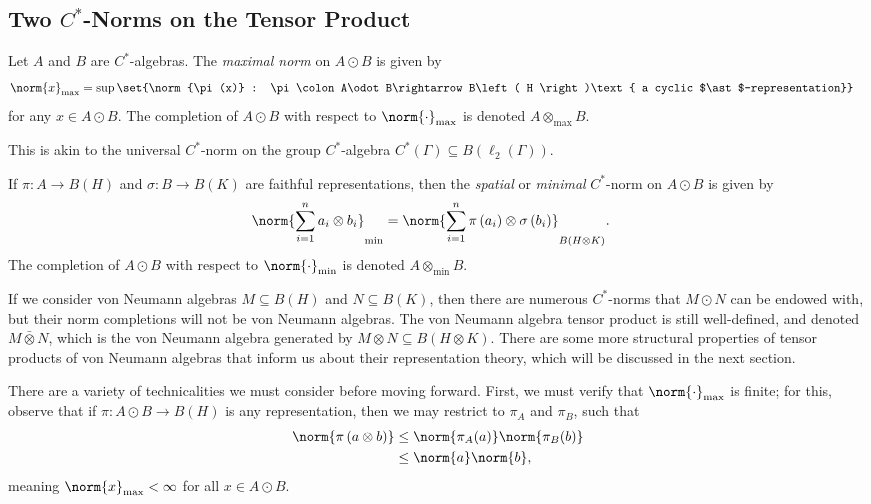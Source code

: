 \documentclass[10pt]{mypackage}
\begin{document}
\subsection{Two $C^{\ast}$-Norms on the Tensor Product}%
\begin{definition}
  Let $A$ and $B$ are $C^{\ast}$-algebras. The \textit{maximal norm} on $A\odot B$ is given by
  \begin{align*}
    \norm{x}_{\max} &= \sup\set{\norm{\pi(x)} : \pi\colon A\odot B\rightarrow B\left( H \right)\text{ a cyclic $\ast$-representation}}
  \end{align*}
  for any $x\in A\odot B$. The completion of $A\odot B$ with respect to $\norm{\cdot}_{\max}$ is denoted $A \otimes_{\max}B$.
\end{definition}
This is akin to the universal $C^{\ast}$-norm on the group $C^{\ast}$-algebra $C^{\ast}\left( \Gamma \right)\subseteq B\left( \ell_2\left( \Gamma \right) \right)$.
\begin{definition}
  If $\pi\colon A\rightarrow B\left( H \right)$ and $\sigma\colon B\rightarrow B\left( K \right)$ are faithful representations, then the \textit{spatial} or \textit{minimal} $C^{\ast}$-norm on $A\odot B$ is given by
  \begin{align*}
    \norm{\sum_{i=1}^{n}a_i\otimes b_i}_{\min} &= \norm{\sum_{i=1}^{n}\pi\left( a_i \right)\otimes \sigma\left( b_i \right)}_{B\left( H\otimes K \right)}.
  \end{align*}
  The completion of $A\odot B$ with respect to $\norm{\cdot}_{\min}$ is denoted $A\otimes_{\min} B$.
\end{definition}
\begin{remark}
  If we consider von Neumann algebras $M\subseteq B(H)$ and $N\subseteq B(K)$, then there are numerous $C^{\ast}$-norms that $M\odot N$ can be endowed with, but their norm completions will not be von Neumann algebras. The von Neumann algebra tensor product is still well-defined, and denoted $M\bar\otimes N$, which is the von Neumann algebra generated by $M\otimes N\subseteq B\left( H\otimes K \right)$. There are some more structural properties of tensor products of von Neumann algebras that inform us about their representation theory, which will be discussed in the next section.
\end{remark}
There are a variety of technicalities we must consider before moving forward. First, we must verify that $\norm{\cdot}_{\max}$ is finite; for this, observe that if $\pi\colon A\odot B\rightarrow B(H)$ is any representation, then we may restrict to $\pi_A$ and $\pi_B$, such that
\begin{align*}
  \norm{\pi\left( a\otimes b \right)} &\leq \norm{\pi_A(a)}\norm{\pi_B(b)}\\
                                       &\leq \norm{a}\norm{b},
\end{align*}
meaning $\norm{x}_{\max}< \infty$ for all $x\in A\odot B$.
\end{document}
